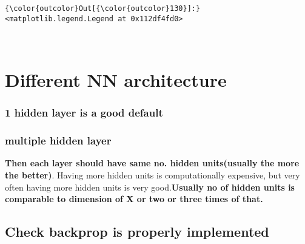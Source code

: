 \documentclass[11pt]{article}
\begin{document}
\begin{Verbatim}[commandchars=\\\{\}]
{\color{outcolor}Out[{\color{outcolor}130}]:} <matplotlib.legend.Legend at 0x112df4fd0>
\end{Verbatim}
            
    \begin{center}
    \end{center}
    { \hspace*{\fill} \\}
    
    \section{Different NN architecture}\label{different-nn-architecture}

\subsubsection{1 hidden layer is a good
default}\label{hidden-layer-is-a-good-default}

\subsubsection{multiple hidden layer}\label{multiple-hidden-layer}

\textbf{Then each layer should have same no. hidden units(usually the
more the better)}. Having more hidden units is computationally
expensive, but very often having more hidden units is very
good.\textbf{Usually no of hidden units is comparable to dimension of X
or two or three times of that.}

    \subsection{Check backprop is properly
implemented}\label{check-backprop-is-properly-implemented}
\end{document}
